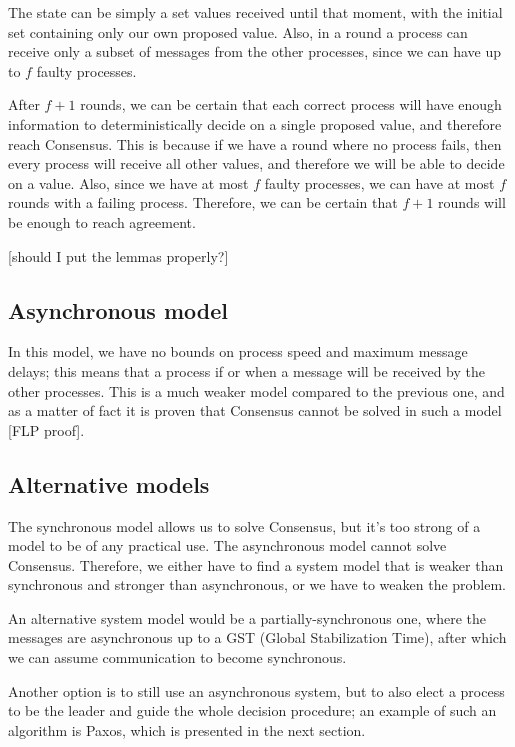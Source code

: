 The state can be simply a set values received until that moment, with the initial set containing only our own proposed value. Also, in a round a process can receive only a subset of messages from the other processes, since we can have up to $f$ faulty processes.

After $f+1$ rounds, we can be certain that each correct process will have enough information to deterministically decide on a single proposed value, and therefore reach Consensus. This is because if we have a round where no process fails, then every process will receive all other values, and therefore we will be able to decide on a value. Also, since we have at most $f$ faulty processes, we can have at most $f$ rounds with a failing process. Therefore, we can be certain that $f+1$ rounds will be enough to reach agreement.

[should I put the lemmas properly?]

\subsection{Asynchronous model}\label{sec:Asynchronous model}
In this model, we have no bounds on process speed and maximum message delays; this means that a process if or when a message will be received by the other processes. This is a much weaker model compared to the previous one, and as a matter of fact it is proven that Consensus cannot be solved in such a model [FLP proof].

\subsection{Alternative models}\label{sec:Alternative models}
The synchronous model allows us to solve Consensus, but it's too strong of a model to be of any practical use. The asynchronous model cannot solve Consensus. Therefore, we either have to find a system model that is weaker than synchronous and stronger than asynchronous, or we have to weaken the problem.

An alternative system model would be a partially-synchronous one, where the messages are asynchronous up to a GST (Global Stabilization Time), after which we can assume communication to become synchronous.

Another option is to still use an asynchronous system, but to also elect a process to be the leader and guide the whole decision procedure; an example of such an algorithm is Paxos, which is presented in the next section.


